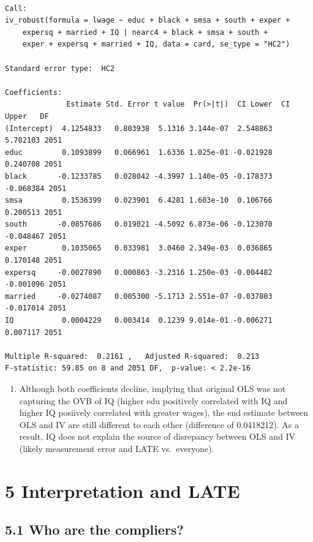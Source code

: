 \documentclass[
  letterpaper,
  DIV=11,
  numbers=noendperiod]{scrartcl}
\providecommand{\tightlist}{%
  \setlength{\itemsep}{0pt}\setlength{\parskip}{0pt}}\usepackage{longtable,booktabs,array}
\begin{document}
\begin{verbatim}

Call:
iv_robust(formula = lwage ~ educ + black + smsa + south + exper + 
    expersq + married + IQ | nearc4 + black + smsa + south + 
    exper + expersq + married + IQ, data = card, se_type = "HC2")

Standard error type:  HC2 

Coefficients:
              Estimate Std. Error t value  Pr(>|t|)  CI Lower  CI Upper   DF
(Intercept)  4.1254833   0.803938  5.1316 3.144e-07  2.548863  5.702103 2051
educ         0.1093899   0.066961  1.6336 1.025e-01 -0.021928  0.240708 2051
black       -0.1233785   0.028042 -4.3997 1.140e-05 -0.178373 -0.068384 2051
smsa         0.1536399   0.023901  6.4281 1.603e-10  0.106766  0.200513 2051
south       -0.0857686   0.019021 -4.5092 6.873e-06 -0.123070 -0.048467 2051
exper        0.1035065   0.033981  3.0460 2.349e-03  0.036865  0.170148 2051
expersq     -0.0027890   0.000863 -3.2316 1.250e-03 -0.004482 -0.001096 2051
married     -0.0274087   0.005300 -5.1713 2.551e-07 -0.037803 -0.017014 2051
IQ           0.0004229   0.003414  0.1239 9.014e-01 -0.006271  0.007117 2051

Multiple R-squared:  0.2161 ,   Adjusted R-squared:  0.213 
F-statistic: 59.85 on 8 and 2051 DF,  p-value: < 2.2e-16
\end{verbatim}

\begin{enumerate}
\def\labelenumi{\alph{enumi}.}
\setcounter{enumi}{2}
\tightlist
\item
  Although both coefficients decline, implying that original OLS was not
  capturing the OVB of IQ (higher edu positively correlated with IQ and
  higher IQ posiively correlated with greater wages), the end estimate
  between OLS and IV are still different to each other (difference of
  0.0418212). As a result, IQ does not explain the source of disrepancy
  between OLS and IV (likely measurement error and LATE vs.~everyone).
\end{enumerate}

\section{5 Interpretation and LATE}\label{interpretation-and-late}

\subsection{5.1 Who are the compliers?}\label{who-are-the-compliers}
\end{document}
